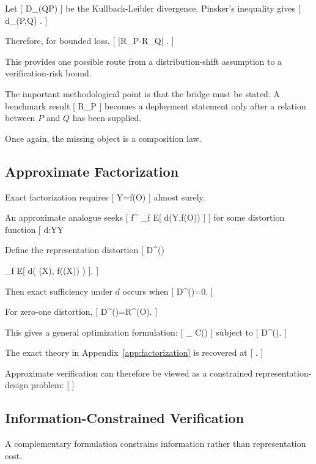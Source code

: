 \documentclass[11pt]{article}
\begin{document}
Let
[
D_{}(Q\Vert P)
]
be the Kullback-Leibler divergence. Pinsker's inequality gives
[
d_{}(P,Q)
\leq
{}.
]

Therefore, for bounded loss,
[
|R_P-R_Q|
\leq
{}.
]

This provides one possible route from a distribution-shift assumption to a verification-risk bound.

The important methodological point is that the bridge must be stated. A benchmark result
[
R_P\leq\varepsilon
]
becomes a deployment statement only after a relation between $P$ and $Q$ has been supplied.

Once again, the missing object is a composition law.

\subsection{Approximate Factorization}

Exact factorization requires
[
Y=f(O)
]
almost surely.

An approximate analogue seeks
[
f^\star
\in
\arg\min_f
\mathbb E[
d(Y,f(O))
]
]
for some distortion function
[
d:\mathcal Y\times\mathcal Y\to[0,\infty).
]

Define the representation distortion
[
D^\star(\pi)

\inf_f
\mathbb E[
d(
\Phi(X),
f(\pi(X))
)
].
]

Then exact sufficiency under $d$ occurs when
[
D^\star(\pi)=0.
]

For zero-one distortion,
[
D^\star(\pi)=R^\star(O).
]

This gives a general optimization formulation:
[
\min_{\pi\in\Pi}
C(\pi)
]
subject to
[
D^\star(\pi)\leq\varepsilon.
]

The exact theory in Appendix~\ref{app:factorization} is recovered at
[
.
]

Approximate verification can therefore be viewed as a constrained representation-design problem:
[
]

\subsection{Information-Constrained Verification}

A complementary formulation constrains information rather than representation cost.
\end{document}
